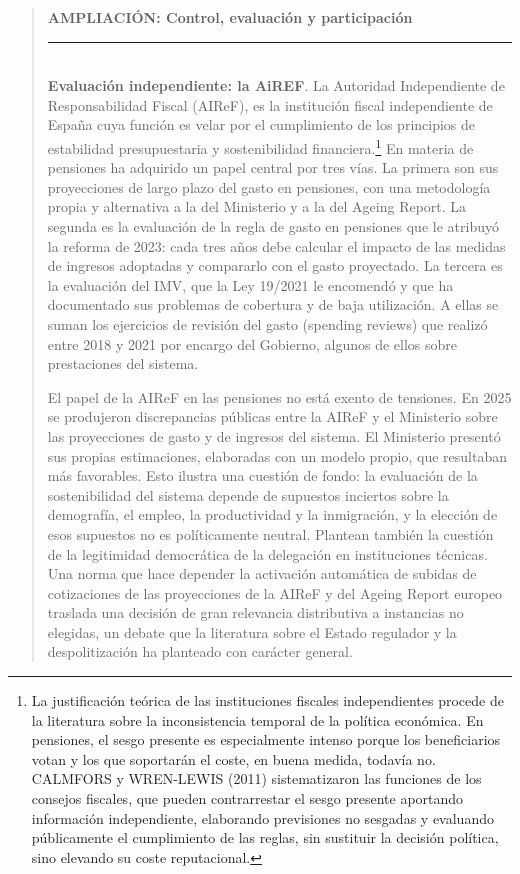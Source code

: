 \documentclass[10pt,a4paper]{article}
\newenvironment{specialblock}[1]{%
      \begin{quote} %
      \small %
      \noindent\textbf{#1}\\[-0.3em] %
      \rule{\linewidth}{0.4pt}\\[0.6em]}{
      \end{quote}}
\begin{document}
\begin{specialblock}{\textbf{AMPLIACIÓN:} Control, evaluación y participación}
    \textbf{Evaluación independiente: la AiREF}. La Autoridad Independiente de Responsabilidad Fiscal (AIReF), es la institución fiscal independiente de España cuya función es velar por el cumplimiento de los principios de estabilidad presupuestaria y sostenibilidad financiera.\footnote{La justificación teórica de las instituciones fiscales independientes procede de la literatura sobre la inconsistencia temporal de la política económica. En pensiones, el sesgo presente es especialmente intenso porque los beneficiarios votan y los que soportarán el coste, en buena medida, todavía no. CALMFORS y WREN-LEWIS (2011) sistematizaron las funciones de los consejos fiscales, que pueden contrarrestar el sesgo presente aportando información independiente, elaborando previsiones no sesgadas y evaluando públicamente el cumplimiento de las reglas, sin sustituir la decisión política, sino elevando su coste reputacional.
    } En materia de pensiones ha adquirido un papel central por tres vías. La primera son sus proyecciones de largo plazo del gasto en pensiones, con una metodología propia y alternativa a la del Ministerio y a la del Ageing Report. La segunda es la evaluación de la regla de gasto en pensiones que le atribuyó la reforma de 2023: cada tres años debe calcular el impacto de las medidas de ingresos adoptadas y compararlo con el gasto proyectado. La tercera es la evaluación del IMV, que la Ley 19/2021 le encomendó y que ha documentado sus problemas de cobertura y de baja utilización. A ellas se suman los ejercicios de revisión del gasto (spending reviews) que realizó entre 2018 y 2021 por encargo del Gobierno, algunos de ellos sobre prestaciones del sistema.
    
    El papel de la AIReF en las pensiones no está exento de tensiones. En 2025 se produjeron discrepancias públicas entre la AIReF y el Ministerio sobre las proyecciones de gasto y de ingresos del sistema. El Ministerio presentó sus propias estimaciones, elaboradas con un modelo propio, que resultaban más favorables. Esto ilustra una cuestión de fondo: la evaluación de la sostenibilidad del sistema depende de supuestos inciertos sobre la demografía, el empleo, la productividad y la inmigración, y la elección de esos supuestos no es políticamente neutral. Plantean también la cuestión de la legitimidad democrática de la delegación en instituciones técnicas. Una norma que hace depender la activación automática de subidas de cotizaciones de las proyecciones de la AIReF y del Ageing Report europeo traslada una decisión de gran relevancia distributiva a instancias no elegidas, un debate que la literatura sobre el Estado regulador y la despolitización ha planteado con carácter general.


\end{specialblock}
\end{document}

